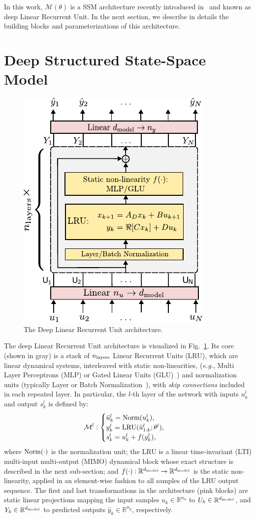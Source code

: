 \documentclass{article} %
\newcommand{\R}{\mathbb{R}}
\newcommand{\ny}{{n_y}}
\newcommand{\nin}{{n_u}}
\newcommand{\dmodel}{{d_{\rm model}}}
\newcommand{\nlayers}{{n_{\rm layers}}}
\begin{document}
In this work, $\mathcal{M}(\theta)$ is a SSM architecture recently introduced in~\cite{Orvieto23} and known as deep Linear Recurrent Unit. In the next section, we describe in details the building blocks and parameterizations of this architecture.

\section{Deep Structured State-Space Model}\label{sec:lru}
\begin{figure}
\centering
\includegraphics[width=.5\linewidth]{figures/architecture/lru_architecture.pdf}
\caption{The Deep Linear Recurrent Unit architecture.}
\label{fig:deep_lru_architecture}
\end{figure}
 The deep Linear Recurrent Unit architecture  is visualized in Fig.~\ref{fig:deep_lru_architecture}. Its core (shown in gray) is a stack of $\nlayers$ Linear Recurrent Units (LRU), which are linear dynamical systems, interleaved with static non-linearities, (\emph{e.g.}, Multi Layer Perceptrons (MLP)  or Gated Linear Units (GLU)~\cite{dauphin2017language}) and normalization units (typically Layer or Batch Normalization~{\cite{Wu2018}}), with \emph{skip connections} included in each repeated layer.  In particular, the $l$-th layer of the network with inputs $u^{l}_k $ and output $s^{l}_k $ is defined by:
 \begin{equation}
  \mathcal{M}^{l}:
    \begin{cases}
      \tilde{u}^{l}_k = {\rm{Norm}}({u}^{l}_k),\\
      y^{l}_k = \mathrm{LRU}(\tilde{u}^{l}_{1:k};\theta^l),  \\
      s^{l}_k = u^{l}_k + f(y^{l}_k), \\
      \end{cases}       
\end{equation}
where $\rm{Norm}(\cdot)$ is the normalization unit; the LRU is a linear time-invariant (LTI) multi-input multi-output (MIMO) dynamical block whose exact structure is described in the next sub-section; and $f(\cdot):\R^\dmodel \rightarrow \R^\dmodel$ is the static non-linearity, applied in an element-wise fashion to all samples of the LRU output sequence. 
The first and last transformations in the architecture (pink blocks) are static linear projections mapping the input samples $u_k \in \R^{\nin}$ to $U_k \in \R^\dmodel$, and $Y_k \in \R^\dmodel$ to predicted outputs $\hat y_k \in \R^{\ny}$, respectively.
\end{document}

